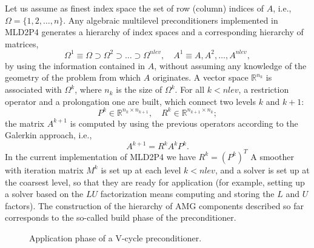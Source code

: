 Let us assume as finest index space the set of row (column) indices of $A$, i.e.,
$\Omega = \{1, 2, \ldots, n\}$. 
Any algebraic multilevel preconditioners implemented in MLD2P4 generates
a hierarchy of index spaces and a corresponding hierarchy of matrices,
\[ \Omega^1 \equiv \Omega \supset \Omega^2 \supset \ldots \supset \Omega^{nlev},
\quad A^1 \equiv A, A^2, \ldots, A^{nlev}, \]
by using the information contained in $A$, without assuming any
knowledge of the geometry of the problem from which $A$ originates.
A vector space $\mathbb{R}^{n_{k}}$ is associated with $\Omega^k$,
where $n_k$ is the size of $\Omega^k$.
For all $k < nlev$, a restriction operator and a prolongation one are built,
which connect two levels $k$ and $k+1$:
\[
    P^k \in \mathbb{R}^{n_k \times n_{k+1}}, \quad 
    R^k \in \mathbb{R}^{n_{k+1}\times n_k};
\]
the matrix $A^{k+1}$ is computed by using the previous operators according
to the Galerkin approach, i.e.,
\[
  A^{k+1}=R^kA^kP^k.
\]
In the current implementation of MLD2P4 we have $R^k=(P^k)^T$
A smoother with iteration matrix $M^k$ is set up at each level $k < nlev$, and a solver
is set up at the coarsest level, so that they are ready for application 
(for example, setting up a solver based on the $LU$ factorization means computing
and storing the $L$ and $U$ factors). The construction of the hierarchy of AMG components
described so far corresponds to the so-called build phase of the preconditioner.

\begin{figure}[t]
\begin{center} 
\caption{Application phase of a V-cycle preconditioner.\label{fig:application_alg}}
\end{center}
\end{figure}

